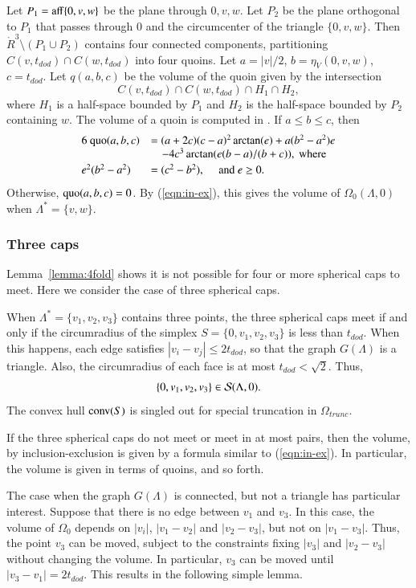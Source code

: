\documentclass{article} %
\begin{document}
Let $P_1={\operatorname{aff}}\{0,v,w\}$ be the plane through $0,v,w$. Let
$P_2$ be the plane orthogonal to $P_1$ that passes through $0$ and the
circumcenter of the triangle $\{0,v,w\}$. Then $\ring{R}^3\setminus
(P_1\cup P_2)$ contains four connected components, partitioning
$C(v,t_{dod})\cap C(w,t_{dod})$ into four quoins. Let $a=|v|/2$,
$b=\eta_V(0,v,w)$, $c=t_{dod}$. Let $q(a,b,c)$ be the volume of the
quoin given by the intersection
$$C(v,t_{dod})\cap C(w,t_{dod}) \cap H_1 \cap H_2,$$
where $H_1$ is a half-space bounded by $P_1$ and $H_2$ is
the half-space bounded by $P_2$ containing $w$.
The volume of a quoin is computed in \cite[\S7.3]{Hales:2006:DCG}.
If $a\le b\le c$, then 
\begin{equation}
\begin{array}{lll}
6\ {\operatorname{quo}}(a,b,c) &= (a+2c) (c-a)^2 \arctan(e) + a(b^2-a^2) e \\
&\quad - 4c^3 \arctan(e(b-a)/(b+c)),\text{ where}\\ [0.5ex]
e^2 (b^2-a^2)&= (c^2 - b^2), \quad \text{ and } e\ge 0.
\end{array}
\end{equation}
Otherwise, ${\operatorname{quo}}(a,b,c) = 0$.  By (\ref{eqn:in-ex}), this gives
the volume of $\Omega_0(\Lambda,0)$ when $\Lambda^*=\{v,w\}$.

\subsubsection{Three caps}

Lemma~\ref{lemma:4fold} shows it is not possible for four or more
spherical caps to meet.  Here we consider the case of three spherical
caps.

When $\Lambda^*=\{v_1,v_2,v_3\}$ contains three points, the three
spherical caps meet if and only if the circumradius of the simplex
$S=\{0,v_1,v_2,v_3\}$ is less than $t_{dod}$. When this happens, each
edge satisfies $|v_i-v_j|\le 2t_{dod}$, so that the graph $G(\Lambda)$ is a
triangle. Also, the circumradius of each face is at most $t_{dod} <
\sqrt2$. Thus,
$$\{0,v_1,v_2,v_3\}\in{\mathcal S}(\Lambda,0).$$
The convex hull ${\operatorname{conv}}(S)$ is singled out for special truncation in
$\Omega_{trunc}$.

If the three spherical caps do not meet or meet in at most pairs,
then the volume, by inclusion-exclusion is given by a formula
similar to (\ref{eqn:in-ex}).  In particular, the volume
is given in terms of quoins, and so forth.

The case when the graph $G(\Lambda)$ is connected, but not a triangle
has particular interest.  Suppose that there is no edge between
$v_1$ and $v_3$. In this case, the volume of $\Omega_0$ depends on
$|v_i|$, $|v_1-v_2|$ and $|v_2-v_3|$, but not on $|v_1-v_3|$.
Thus, the point $v_3$ can be moved, subject to the constraints
fixing $|v_3|$ and $|v_2-v_3|$ without changing the volume.
In particular, $v_3$ can be moved until $|v_3-v_1|=2t_{dod}$.  This
results in the following simple lemma.  
\end{document}
